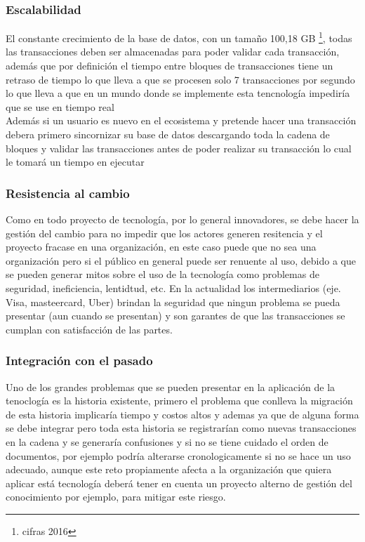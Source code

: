 \subsubsection{Escalabilidad}
El constante crecimiento de la base de datos, con un tamaño 100,18 GB \footnote{cifras 2016}, todas las transacciones deben ser almacenadas para poder validar cada transacción, además que por definición el tiempo entre bloques de transacciones tiene un retraso de tiempo lo que lleva a que se procesen solo 7 transacciones por segundo lo que lleva a que en un mundo donde se implemente esta tencnología impediría que se use en tiempo real \citep{zheng2016blockchain}
\\Además si un usuario es nuevo en el ecosistema y pretende hacer una transacción debera primero sincornizar su base de datos descargando toda la cadena de bloques y validar las transacciones antes de poder realizar su transacción lo cual le tomará un tiempo en ejecutar \citep{crosby2016blockchain}
\subsubsection{Resistencia al cambio}
Como en todo proyecto de tecnología, por lo general innovadores, se debe hacer la gestión del cambio para no impedir que los actores generen resitencia y el proyecto fracase en una organización, en este caso puede que no sea una organización pero si el público en general puede ser renuente al uso, debido a que se pueden generar mitos sobre el uso de la tecnología como problemas de seguridad, ineficiencia, lentidtud, etc. En la actualidad los intermediarios (eje. Visa, masteercard, Uber)\citep{crosby2016blockchain} brindan la seguridad que ningun problema se pueda presentar (aun cuando se presentan) y son garantes de que las transacciones se cumplan con satisfacción de las partes. 
\subsubsection{Integración con el pasado}
Uno de los grandes problemas que se pueden presentar en la aplicación de la tenoclogía es la historia existente, primero el problema que conlleva la migración de esta historia implicaría tiempo y costos altos\citep{crosby2016blockchain} y ademas ya que de alguna forma se debe integrar pero toda esta historia se registrarían como nuevas transacciones en la cadena y se generaría confusiones y si no se tiene cuidado el orden de documentos, por ejemplo podría alterarse cronologicamente si no se hace un uso adecuado, aunque este reto propiamente afecta a la organización que quiera aplicar está tecnología deberá tener en cuenta un proyecto alterno de  gestión del conocimiento por ejemplo, para mitigar este riesgo.

